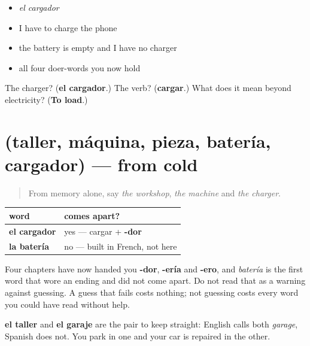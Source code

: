 \begin{itemize}
\raggedright
  \item \emph{el cargador}
  \item I have to charge the phone
  \item the battery is empty and I have no charger
  \item all four doer-words you now hold
\end{itemize}

\begin{tcolorbox}[breakable,colback=teal!4,colframe=teal!35!black,title={Before you move on}]
The charger? (\textbf{el cargador}.) The verb? (\textbf{cargar}.) What does it mean beyond electricity? (\textbf{To load}.)
\end{tcolorbox}
\section[(taller, máquina, pieza, batería …]{(taller, máquina, pieza, batería, cargador) — from cold}

\label{lesson:ES-R434-repaso-maquina}



\begin{quote}
From memory alone, say \emph{the workshop}, \emph{the machine} and \emph{the charger}.
\end{quote}

\begin{grammarlens}[title={Grammar Lens: the guess, and the one that failed}]
\noindent
\begin{tabularx}{\linewidth}{@{}>{\raggedright\arraybackslash}X>{\raggedright\arraybackslash}X@{}}
\toprule
\textbf{word} & \textbf{comes apart?} \\
\midrule
\textbf{el cargador} & yes — cargar + \textbf{-dor} \\
\textbf{la batería} & no — built in French, not here \\
\bottomrule
\end{tabularx}

Four chapters have now handed you \textbf{-dor}, \textbf{-ería} and \textbf{-ero}, and \emph{batería} is the first word that wore an ending and did not come apart. Do not read that as a warning against guessing. A guess that fails costs nothing; not guessing costs every word you could have read without help.

\textbf{el taller} and \textbf{el garaje} are the pair to keep straight: English calls both \emph{garage}, Spanish does not. You park in one and your car is repaired in the other.
\end{grammarlens}

